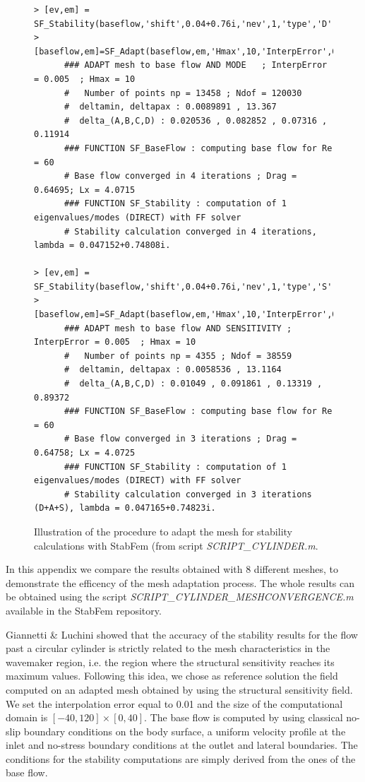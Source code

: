 \documentclass[twocolumn,10pt]{asme2ej}
\begin{document}
\begin{figure}
\small
\begin{lstlisting}
> [ev,em] = SF_Stability(baseflow,'shift',0.04+0.76i,'nev',1,'type','D');
> [baseflow,em]=SF_Adapt(baseflow,em,'Hmax',10,'InterpError',0.005);  
      ### ADAPT mesh to base flow AND MODE   ; InterpError = 0.005  ; Hmax = 10
      #   Number of points np = 13458 ; Ndof = 120030
      #  deltamin, deltapax : 0.0089891 , 13.367
      #  delta_(A,B,C,D) : 0.020536 , 0.082852 , 0.07316 , 0.11914
      ### FUNCTION SF_BaseFlow : computing base flow for Re = 60
      # Base flow converged in 4 iterations ; Drag = 0.64695; Lx = 4.0715
      ### FUNCTION SF_Stability : computation of 1 eigenvalues/modes (DIRECT) with FF solver
      # Stability calculation converged in 4 iterations, lambda = 0.047152+0.74808i.

> [ev,em] = SF_Stability(baseflow,'shift',0.04+0.76i,'nev',1,'type','S');
> [baseflow,em]=SF_Adapt(baseflow,em,'Hmax',10,'InterpError',0.005);
      ### ADAPT mesh to base flow AND SENSITIVITY ; InterpError = 0.005  ; Hmax = 10
      #   Number of points np = 4355 ; Ndof = 38559
      #  deltamin, deltapax : 0.0058536 , 13.1164
      #  delta_(A,B,C,D) : 0.01049 , 0.091861 , 0.13319 , 0.89372
      ### FUNCTION SF_BaseFlow : computing base flow for Re = 60
      # Base flow converged in 3 iterations ; Drag = 0.64758; Lx = 4.0725
      ### FUNCTION SF_Stability : computation of 1 eigenvalues/modes (DIRECT) with FF solver
      # Stability calculation converged in 3 iterations (D+A+S), lambda = 0.047165+0.74823i.

\end{lstlisting}
\normalsize

\caption{Illustration of the procedure to adapt the mesh for stability calculations with StabFem (from script {\em SCRIPT\_CYLINDER.m}. }
\label{stabmesh}
\end{figure}

In this appendix we compare the results obtained with 8 different meshes, to demonstrate the efficency of the mesh adaptation process. The whole results can be obtained using the script {\em SCRIPT\_CYLINDER\_MESHCONVERGENCE.m} available in the StabFem repository.

Giannetti \& Luchini\cite{GiannettiLuchini} showed that the accuracy of the stability 
results for the flow past a circular cylinder is strictly related to the mesh characteristics 
in the wavemaker region, i.e. the region where the structural sensitivity reaches its 
maximum values. Following this idea, we chose as reference solution the field
computed on an adapted mesh obtained by using the structural sensitivity field.
We set the interpolation error equal to 0.01 and the size of the computational domain 
is $[-40,120]\times[0,40]$. The base flow is computed by using classical no-slip 
boundary conditions on the body surface, a uniform velocity profile at the inlet
and no-stress boundary conditions at the outlet and lateral boundaries.
The conditions for the stability computations are simply derived from the ones of the base flow.
\end{document}
